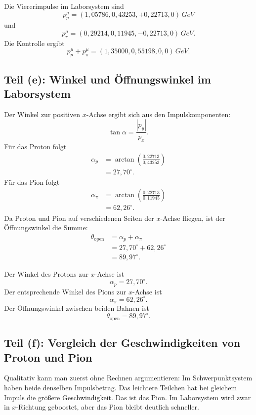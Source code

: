 \documentclass[11pt,a4paper]{scrartcl}
\newcommand{\abs}[1]{\left| #1 \right|}
\newcommand{\paren}[1]{\left( #1 \right)}
\newcommand{\GeV}{\si{GeV}}
\newcommand{\fourp}[4]{\paren{#1,#2,#3,#4}}
\theoremstyle{definition}
\theoremstyle{plain}
\theoremstyle{remark}
\begin{document}
\begin{answerbox}
Die Viererimpulse im Laborsystem sind
\[
    \boxed{p_p^\mu=\fourp{1,05786}{0,43253}{+0,22713}{0}\,\GeV}
\]
und
\[
    \boxed{p_\pi^\mu=\fourp{0,29214}{0,11945}{-0,22713}{0}\,\GeV}.
\]
Die Kontrolle ergibt
\[
    \boxed{p_p^\mu+p_\pi^\mu=\fourp{1,35000}{0,55198}{0}{0}\,\GeV}.
\]
\end{answerbox}

\subsection{Teil (e): Winkel und \"Offnungswinkel im Laborsystem}

\begin{calculationbox}
Der Winkel zur positiven $x$-Achse ergibt sich aus den Impulskomponenten:
\[
    \tan\alpha=\frac{\abs{p_y}}{p_x}.
\]
F\"ur das Proton folgt
\begin{align*}
    \alpha_p
    &=\arctan\paren{\frac{0,22713}{0,43253}} \\
    &=27,70^\circ.
\end{align*}
F\"ur das Pion folgt
\begin{align*}
    \alpha_\pi
    &=\arctan\paren{\frac{0,22713}{0,11945}} \\
    &=62,26^\circ.
\end{align*}
Da Proton und Pion auf verschiedenen Seiten der $x$-Achse fliegen, ist der \"Offnungswinkel die Summe:
\begin{align*}
    \theta_{\mathrm{open}}
    &=\alpha_p+\alpha_\pi \\
    &=27,70^\circ+62,26^\circ \\
    &=89,97^\circ.
\end{align*}
\end{calculationbox}

\begin{answerbox}
Der Winkel des Protons zur $x$-Achse ist
\[
    \boxed{\alpha_p=27,70^\circ}.
\]
Der entsprechende Winkel des Pions zur $x$-Achse ist
\[
    \boxed{\alpha_\pi=62,26^\circ}.
\]
Der \"Offnungswinkel zwischen beiden Bahnen ist
\[
    \boxed{\theta_{\mathrm{open}}=89,97^\circ}.
\]
\end{answerbox}

\subsection{Teil (f): Vergleich der Geschwindigkeiten von Proton und Pion}

\begin{presentationbox}
Qualitativ kann man zuerst ohne Rechnen argumentieren: Im Schwerpunktsystem haben beide denselben Impulsbetrag. Das leichtere Teilchen hat bei gleichem Impuls die gr\"o\ss ere Geschwindigkeit. Das ist das Pion. Im Laborsystem wird zwar in $x$-Richtung geboostet, aber das Pion bleibt deutlich schneller.
\end{presentationbox}
\end{document}
